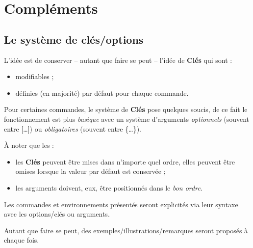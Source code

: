 \documentclass[a4paper,french,11pt]{article}
\newcommand\Cle[1]{{\bfseries\sffamily\textlangle \textcolor{orange!75!black}{#1}\textrangle}}
\begin{document}

\pagebreak

\section{Compléments}

\subsection{Le système de \og clés/options \fg}

\begin{tipblock}
L'idée est de conserver -- autant que faire se peut -- l'idée de \Cle{Clés} qui sont :
%
\begin{itemize}
	\item modifiables ;
	\item définies (en majorité) par défaut pour chaque commande.
\end{itemize}

Pour certaines commandes, le système de \Cle{Clés} pose quelques soucis, de ce fait le fonctionnement est plus \textit{basique} avec un système d'\textsf{arguments} \textit{optionnels} (souvent entre \textsf{[\ldots]}) ou \textit{obligatoires} (souvent entre \textsf{\{\ldots\}}).

\smallskip

À noter que les :
%
\begin{itemize}
	\item les \Cle{Clés} peuvent être mises dans n'importe quel ordre, elles peuvent être omises lorsque la valeur par défaut est conservée ;
	\item les \textsf{arguments} doivent, eux, être positionnés dans le \textit{bon ordre}.
\end{itemize}
\vspace*{-\baselineskip}\leavevmode
\end{tipblock}

\begin{noteblock}
Les \textsf{commandes} et \textsf{environnements} présentés seront explicités via leur \textsf{syntaxe} avec les \textsf{options/clés} ou \textsf{arguments}.

Autant que faire se peut, des exemples/illustrations/remarques seront proposés à chaque fois.
\end{noteblock}
\end{document}
